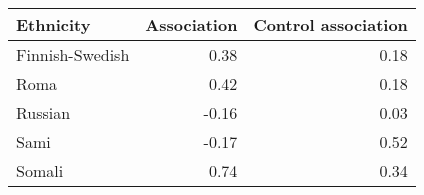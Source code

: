 \begin{tabular}{lrr}
\toprule
      Ethnicity &  Association &  Control association \\
\midrule
Finnish-Swedish &         0.38 &                 0.18 \\
           Roma &         0.42 &                 0.18 \\
        Russian &        -0.16 &                 0.03 \\
           Sami &        -0.17 &                 0.52 \\
         Somali &         0.74 &                 0.34 \\
\bottomrule
\end{tabular}
